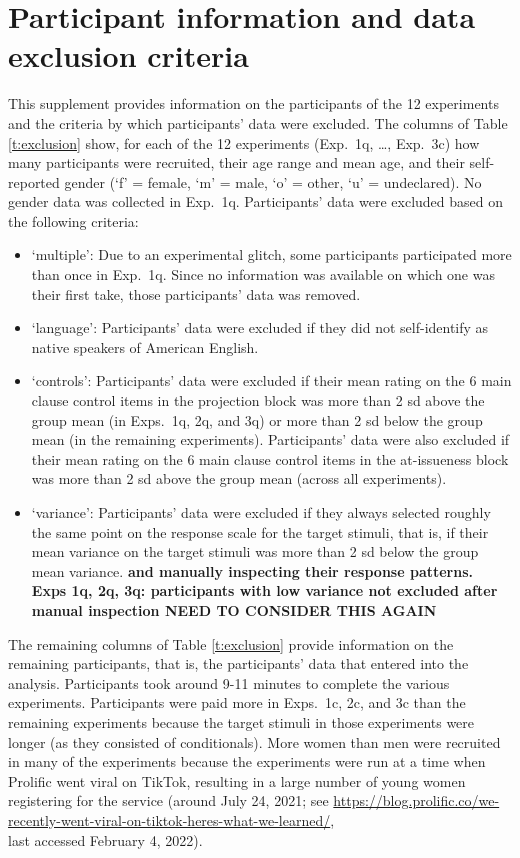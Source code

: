 \documentclass[11pt,fleqn]{article}
\newcommand{\6}{\mbox{$[\hspace*{-.6mm}[$}}
\newcommand{\9}{\mbox{$]\hspace*{-.6mm}]$}}
\begin{document}
\section{Participant information and data exclusion criteria}\label{a-participants}

This supplement provides information on the participants of the 12 experiments and the criteria by which participants' data were excluded. The columns of Table \ref{t:exclusion} show, for each of the 12 experiments (Exp.~1q, \ldots, Exp.~3c) how many participants were recruited, their age range and mean age, and their self-reported gender (`f' = female, `m' = male, `o' = other, `u' = undeclared). No gender data was collected in Exp.~1q. Participants' data were excluded based on the following criteria:

\begin{itemize}[itemsep=-2pt]

\item `multiple': Due to an experimental glitch, some participants participated more than once in Exp.~1q. Since no information was available on which one was their first take, those participants' data was removed. 

\item `language': Participants' data were excluded if they did not self-identify as native speakers of American English.

\item `controls': Participants' data were excluded if their mean rating on the 6 main clause control items in the projection block was more than 2 sd above the group mean (in Exps.~1q, 2q, and 3q) or more than 2 sd below the group mean (in the remaining experiments). Participants' data were also excluded if their mean rating on the 6 main clause control items in the at-issueness block was more than 2 sd above the group mean (across all experiments).
 
\item `variance': Participants' data were excluded if they always selected roughly the same point on the response scale for the target stimuli, that is, if their mean variance on the target stimuli was more than 2 sd below the group mean variance. {\bf and manually inspecting their response patterns. Exps 1q, 2q, 3q: participants with low variance not excluded after manual inspection NEED TO CONSIDER THIS AGAIN}
\end{itemize}

The remaining columns of Table \ref{t:exclusion} provide information on the remaining participants, that is, the participants' data that entered into the analysis. Participants took around 9-11 minutes to complete the various experiments. Participants were paid more in Exps.~1c, 2c, and 3c than the remaining experiments because the target stimuli in those experiments were longer (as they consisted of conditionals). More women than men were recruited in many of the experiments because the experiments were run at a time when Prolific went viral on TikTok, resulting in a large number of young women registering for the service (around July 24, 2021; see \url{https://blog.prolific.co/we-recently-went-viral-on-tiktok-heres-what-we-learned/}, \\ last accessed February 4, 2022).  
\end{document}
